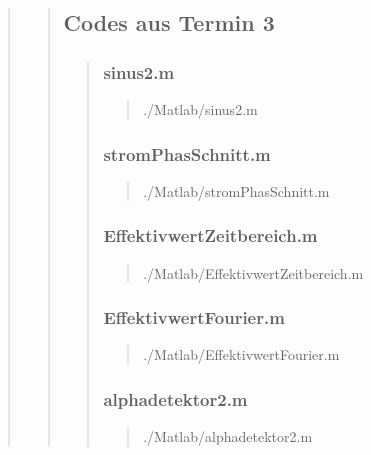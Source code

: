 \begin{quote}
\begin{quote}
	\subsection{Codes aus Termin 3}
	\begin{quote}
	    \subsubsection{sinus2.m}
	    \begin{quote}
	        
	            {./Matlab/sinus2.m}
	    \end{quote}
    
	    \subsubsection{stromPhasSchnitt.m}
	    \begin{quote}
	        
	            {./Matlab/stromPhasSchnitt.m}
	    \end{quote}
    
	    \subsubsection{EffektivwertZeitbereich.m}
	    \begin{quote}
	        
	            {./Matlab/EffektivwertZeitbereich.m}
	    \end{quote}
    
	    \subsubsection{EffektivwertFourier.m}
	    \begin{quote}
	        
	            {./Matlab/EffektivwertFourier.m}
	    \end{quote}
	    \subsubsection{alphadetektor2.m}
        \begin{quote}
            
                {./Matlab/alphadetektor2.m}
        \end{quote}
        

\end{quote}
\end{quote}
\end{quote}
